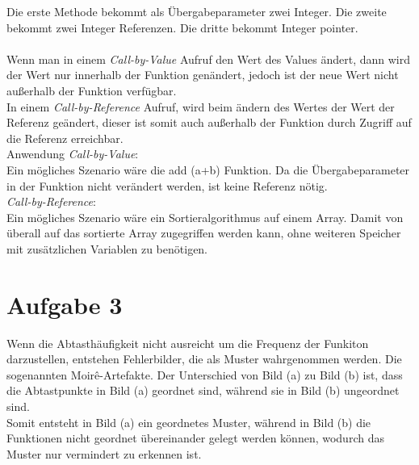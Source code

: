 \documentclass[12pt]{article}
\begin{document}
\begin{enumerate}[a)]
\begin{lstlisting}
\end{lstlisting}  
Die erste Methode bekommt als Übergabeparameter zwei Integer. Die zweite bekommt zwei Integer Referenzen. Die dritte bekommt Integer pointer.\\
\\
Wenn man in einem \emph{Call-by-Value} Aufruf den Wert des Values \"andert, dann wird der Wert nur innerhalb der Funktion gen\"andert, jedoch ist der neue Wert nicht au{\ss}erhalb der Funktion verf\"ugbar.\\
In einem \emph{Call-by-Reference} Aufruf, wird beim \"andern des Wertes der Wert der Referenz ge\"andert, dieser ist somit auch au{\ss}erhalb der Funktion durch Zugriff auf die Referenz erreichbar.\\
Anwendung \emph{Call-by-Value}:\\
Ein mögliches Szenario wäre die add (a+b) Funktion. Da die Übergabeparameter in der Funktion nicht verändert werden, ist keine Referenz nötig.\\
\emph{Call-by-Reference}:\\
Ein mögliches Szenario wäre ein Sortieralgorithmus auf einem Array. Damit von überall auf das sortierte Array zugegriffen werden kann, ohne weiteren Speicher mit zusätzlichen Variablen zu benötigen.
\end{enumerate}

\section*{Aufgabe 3}
Wenn die Abtasth\"aufigkeit nicht ausreicht um die Frequenz der Funkiton darzustellen, entstehen Fehlerbilder, die als Muster wahrgenommen werden. Die sogenannten Moirê-Artefakte. 
Der Unterschied von Bild (a) zu Bild (b) ist, dass die Abtastpunkte in Bild (a) geordnet sind, w\"ahrend sie in Bild (b) ungeordnet sind.\\
Somit entsteht in Bild (a) ein geordnetes Muster, w\"ahrend in Bild (b) die Funktionen nicht geordnet \"ubereinander gelegt werden k\"onnen, wodurch das Muster nur vermindert zu erkennen ist. 
\end{document}
